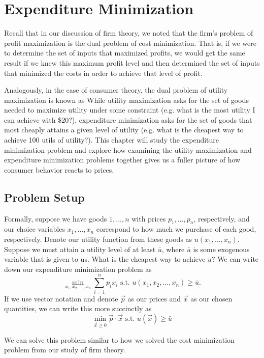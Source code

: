 \chapter{Expenditure Minimization}

Recall that in our discussion of firm theory, we noted that the firm's problem of profit maximization is the dual problem of cost minimization. That is, if we were to determine the set of inputs that maximized profits, we would get the same result if we knew this maximum profit level and then determined the set of inputs that minimized the costs in order to achieve that level of profit. 

Analogously, in the case of consumer theory, the dual problem of utility maximization is known as  While utility maximization asks for the set of goods needed to maximize utility under some constraint (e.g. what is the most utility I can achieve with \$20?), expenditure minimization asks for the set of goods that most cheaply attains a given level of utility (e.g. what is the cheapest way to achieve 100 utils of utility?). This chapter will study the expenditure minimization problem and explore how examining the utility maximization and expenditure minimization problems together gives us a fuller picture of how consumer behavior reacts to prices.

\section{Problem Setup}

Formally, suppose we have goods $1, \ldots, n$ with prices $p_1, \ldots, p_n$, respectively, and our choice variables $x_1, \ldots, x_n$ correspond to how much we purchase of each good, respectively. Denote our utility function from these goods as $u(x_1, \ldots, x_n)$. Suppose we must attain a utility level of at least $\bar{u}$, where $\bar{u}$ is some exogenous variable that is given to us. What is the cheapest way to achieve $\bar{u}$? We can write down our expenditure minimization problem as 
$$\min _{x_{1}, x_{2}, \ldots, x_{n}} \sum_{i=1}^{n} p_{i} x_{i} \text { s.t. } u\left(x_{1}, x_{2}, \ldots, x_{n}\right) \geq \bar{u}.$$
If we use vector notation and denote $\vec{p}$ as our prices and $\vec{x}$ as our chosen quantities, we can write this more succinctly as
$$\min _{\vec{x} \geq 0} \vec{p} \cdot \vec{x} \text { s.t. } u(\vec{x}) \geq \bar{u}$$

We can solve this problem similar to how we solved the cost minimization problem from our study of firm theory.

